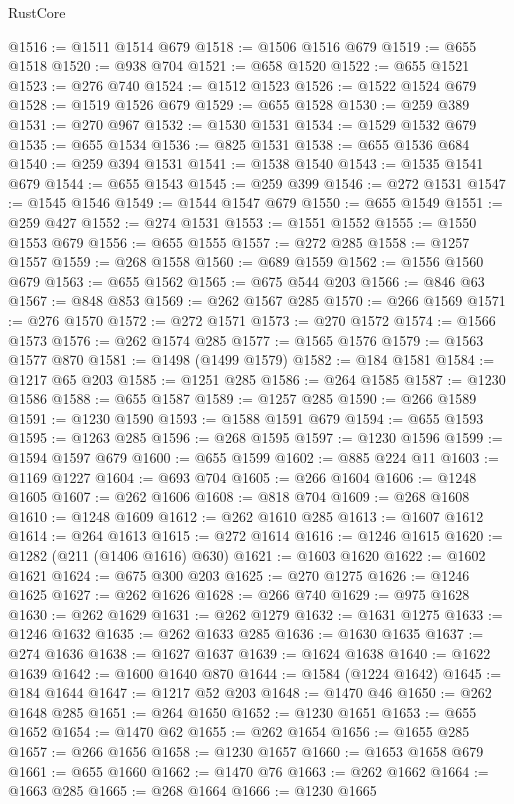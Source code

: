 \begin{lexlean}{RustCore}
\begin{coremodule}
@1516 := @1511 @1514 @679
@1518 := @1506 @1516 @679
@1519 := @655 @1518
@1520 := @938 @704
@1521 := @658 @1520
@1522 := @655 @1521
@1523 := @276 @740
@1524 := @1512 @1523
@1526 := @1522 @1524 @679
@1528 := @1519 @1526 @679
@1529 := @655 @1528
@1530 := @259 @389
@1531 := @270 @967
@1532 := @1530 @1531
@1534 := @1529 @1532 @679
@1535 := @655 @1534
@1536 := @825 @1531
@1538 := @655 @1536 @684
@1540 := @259 @394 @1531
@1541 := @1538 @1540
@1543 := @1535 @1541 @679
@1544 := @655 @1543
@1545 := @259 @399
@1546 := @272 @1531
@1547 := @1545 @1546
@1549 := @1544 @1547 @679
@1550 := @655 @1549
@1551 := @259 @427
@1552 := @274 @1531
@1553 := @1551 @1552
@1555 := @1550 @1553 @679
@1556 := @655 @1555
@1557 := @272 @285
@1558 := @1257 @1557
@1559 := @268 @1558
@1560 := @689 @1559
@1562 := @1556 @1560 @679
@1563 := @655 @1562
@1565 := @675 @544 @203
@1566 := @846 @63
@1567 := @848 @853
@1569 := @262 @1567 @285
@1570 := @266 @1569
@1571 := @276 @1570
@1572 := @272 @1571
@1573 := @270 @1572
@1574 := @1566 @1573
@1576 := @262 @1574 @285
@1577 := @1565 @1576
@1579 := @1563 @1577 @870
@1581 := @1498 (@1499 @1579)
@1582 := @184 @1581
@1584 := @1217 @65 @203
@1585 := @1251 @285
@1586 := @264 @1585
@1587 := @1230 @1586
@1588 := @655 @1587
@1589 := @1257 @285
@1590 := @266 @1589
@1591 := @1230 @1590
@1593 := @1588 @1591 @679
@1594 := @655 @1593
@1595 := @1263 @285
@1596 := @268 @1595
@1597 := @1230 @1596
@1599 := @1594 @1597 @679
@1600 := @655 @1599
@1602 := @885 @224 @11
@1603 := @1169 @1227
@1604 := @693 @704
@1605 := @266 @1604
@1606 := @1248 @1605
@1607 := @262 @1606
@1608 := @818 @704
@1609 := @268 @1608
@1610 := @1248 @1609
@1612 := @262 @1610 @285
@1613 := @1607 @1612
@1614 := @264 @1613
@1615 := @272 @1614
@1616 := @1246 @1615
@1620 := @1282 (@211 (@1406 @1616) @630)
@1621 := @1603 @1620
@1622 := @1602 @1621
@1624 := @675 @300 @203
@1625 := @270 @1275
@1626 := @1246 @1625
@1627 := @262 @1626
@1628 := @266 @740
@1629 := @975 @1628
@1630 := @262 @1629
@1631 := @262 @1279
@1632 := @1631 @1275
@1633 := @1246 @1632
@1635 := @262 @1633 @285
@1636 := @1630 @1635
@1637 := @274 @1636
@1638 := @1627 @1637
@1639 := @1624 @1638
@1640 := @1622 @1639
@1642 := @1600 @1640 @870
@1644 := @1584 (@1224 @1642)
@1645 := @184 @1644
@1647 := @1217 @52 @203
@1648 := @1470 @46
@1650 := @262 @1648 @285
@1651 := @264 @1650
@1652 := @1230 @1651
@1653 := @655 @1652
@1654 := @1470 @62
@1655 := @262 @1654
@1656 := @1655 @285
@1657 := @266 @1656
@1658 := @1230 @1657
@1660 := @1653 @1658 @679
@1661 := @655 @1660
@1662 := @1470 @76
@1663 := @262 @1662
@1664 := @1663 @285
@1665 := @268 @1664
@1666 := @1230 @1665

\end{coremodule}
\end{lexlean}
